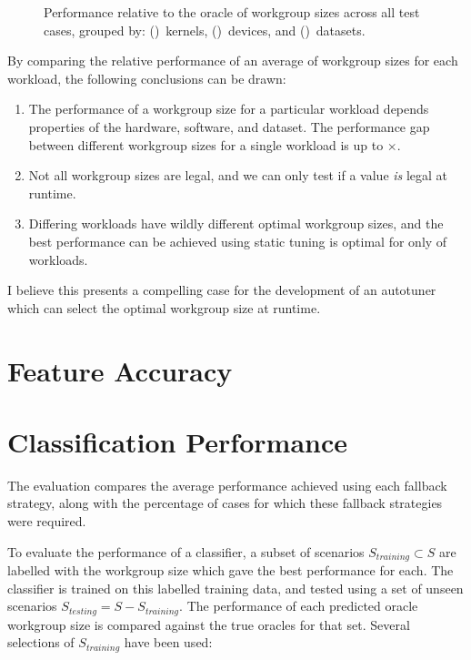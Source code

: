 \begin{figure}

\caption{%
  Performance relative to the oracle of workgroup sizes across all
  test cases, grouped by: ()~kernels,
  ()~devices, and
  ()~datasets.%
}
\label{fig:performances}
\end{figure}

By comparing the relative performance of an average of
 workgroup sizes for each workload, the
following conclusions can be drawn:

\begin{enumerate}
\item The performance of a workgroup size for a particular workload
  depends properties of the hardware, software, and dataset. The
  performance gap between different workgroup sizes for a single
  workload is up to $\times$.
\item Not all workgroup sizes are legal, and we can only test if a
  value \emph{is} legal at runtime.
\item Differing workloads have wildly different optimal workgroup
  sizes, and the best performance can be achieved using static tuning
  is optimal for only  of
  workloads.
\end{enumerate}

I believe this presents a compelling case for the development of an
autotuner which can select the optimal workgroup size at runtime.


\section{Feature Accuracy}



\section{Classification Performance}

The evaluation compares the average performance achieved using each
fallback strategy, along with the percentage of cases for which these
fallback strategies were required.

To evaluate the performance of a classifier, a subset of scenarios
$S_{training} \subset S$ are labelled with the workgroup size which
gave the best performance for each. The classifier is trained on this
labelled training data, and tested using a set of unseen scenarios
$S_{testing} = S - S_{training}$. The performance of each predicted
oracle workgroup size is compared against the true oracles for that
set. Several selections of $S_{training}$ have been used:

